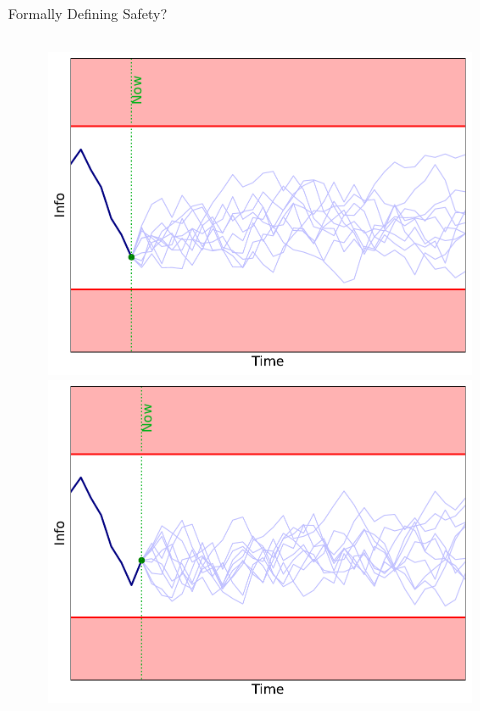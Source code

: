 \documentclass[lecture]{beamer}
\begin{document}
\begin{frame}{\normalsize Formally Defining Safety?}
\begin{columns}[t]
\begin{overlayarea}{\textwidth}{0.3\textheight}
\begin{figure}
{       \hspace{-1.5cm}             \includegraphics[width=\FS\textwidth]{Codes/BasicsSafety/Safe6.pdf}
               }%
        {%
       \hspace{-1.5cm}             \includegraphics[width=\FS\textwidth]{Codes/BasicsSafety/Safe7.pdf}
               }%
    \end{figure}
  \end{overlayarea} 
  
  
  

\end{columns}

\end{frame}
\end{document}
